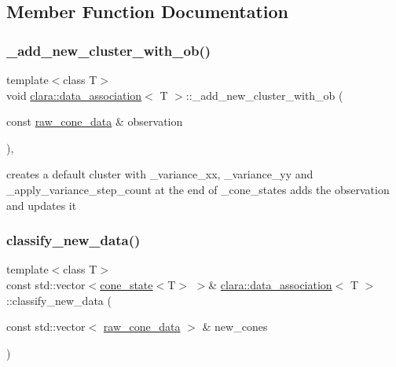 \subsection{Member Function Documentation}
\mbox{\label{classclara_1_1data__association_a24a852f872de092b9684a313e48e4172}} 
\subsubsection{\texorpdfstring{\+\_\+add\+\_\+new\+\_\+cluster\+\_\+with\+\_\+ob()}{\_add\_new\_cluster\_with\_ob()}}
{\footnotesize\ttfamily template$<$class T$>$ \\
void \hyperlink{classclara_1_1data__association}{clara\+::data\+\_\+association}$<$ T $>$\+::\+\_\+add\+\_\+new\+\_\+cluster\+\_\+with\+\_\+ob (\begin{DoxyParamCaption}\item[{const \hyperlink{classclara_1_1data__association_a8232de58bbfc0b4897e4efa62ca97ccc}{raw\+\_\+cone\+\_\+data} \&}]{observation }\end{DoxyParamCaption})\hspace{0.3cm}{\ttfamily [inline]}, {\ttfamily [private]}}

creates a default cluster with \+\_\+variance\+\_\+xx, \+\_\+variance\+\_\+yy and \+\_\+apply\+\_\+variance\+\_\+step\+\_\+count at the end of \+\_\+cone\+\_\+states adds the observation and updates it \mbox{\label{classclara_1_1data__association_a4e03c0b8425a004866c059283be5eeef}} 
\subsubsection{\texorpdfstring{classify\+\_\+new\+\_\+data()}{classify\_new\_data()}}
{\footnotesize\ttfamily template$<$class T$>$ \\
const std\+::vector$<$\hyperlink{classclara_1_1cone__state}{cone\+\_\+state}$<$T$>$ $>$\& \hyperlink{classclara_1_1data__association}{clara\+::data\+\_\+association}$<$ T $>$\+::classify\+\_\+new\+\_\+data (\begin{DoxyParamCaption}\item[{const std\+::vector$<$ \hyperlink{classclara_1_1data__association_a8232de58bbfc0b4897e4efa62ca97ccc}{raw\+\_\+cone\+\_\+data} $>$ \&}]{new\+\_\+cones }\end{DoxyParamCaption})\hspace{0.3cm}{\ttfamily [inline]}}



